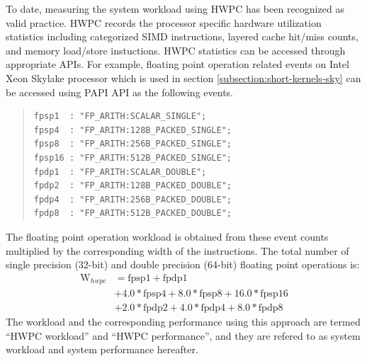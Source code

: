 \documentclass[conference]{IEEEtran}
\begin{document}
To date, measuring the system workload using HWPC has been recognized
as valid practice.
HWPC records the processor specific hardware utilization statistics
including categorized SIMD instructions,
layered cache hit/miss counts,
and memory load/store instuctions.
HWPC statistics can be accessed through appropriate APIs.
For example, floating point operation related events on
Intel Xeon Skylake processor %
which is used in section \ref{subsection:short-kernels-sky}
can be accessed using PAPI API as the following events.
\vspace{1mm}
\begin{quote}
\begin{small}
\begin{verbatim}
fpsp1  : "FP_ARITH:SCALAR_SINGLE";
fpsp4  : "FP_ARITH:128B_PACKED_SINGLE";
fpsp8  : "FP_ARITH:256B_PACKED_SINGLE";
fpsp16 : "FP_ARITH:512B_PACKED_SINGLE";
fpdp1  : "FP_ARITH:SCALAR_DOUBLE";
fpdp2  : "FP_ARITH:128B_PACKED_DOUBLE";
fpdp4  : "FP_ARITH:256B_PACKED_DOUBLE";
fpdp8  : "FP_ARITH:512B_PACKED_DOUBLE";
\end{verbatim}
\end{small}
\end{quote}
\vspace{1mm}
%
The floating point operation workload is obtained from
these event counts multiplied by the corresponding width of the instructions.
The total number of
single precision (32-bit) and double precision (64-bit) 
floating point operations is:
%
%
\begin{align}
	\mathrm{W}_{hwpc} & = \mathrm{fpsp1} + \mathrm{fpdp1} \nonumber \\
			& + 4.0*\mathrm{fpsp4} + 8.0*\mathrm{fpsp8} + 16.0*\mathrm{fpsp16} \nonumber \\
			& + 2.0*\mathrm{fpdp2} + 4.0*\mathrm{fpdp4} + 8.0*\mathrm{fpdp8}
\end{align}
%
The workload and the corresponding performance using this approach are termed
``HWPC workload'' and  ``HWPC performance'',
and they are refered to as system workload and system performance hereafter.
\end{document}
